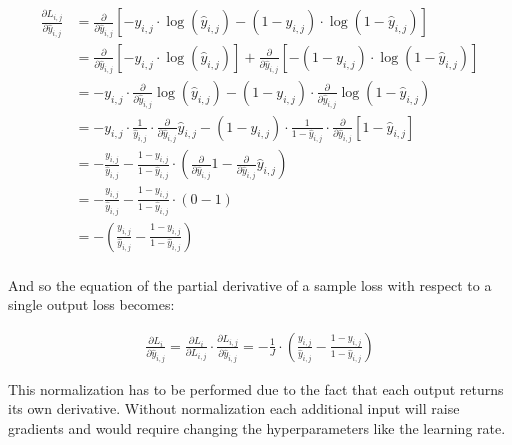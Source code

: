\documentclass[a4paper]{article}
\begin{document}
\begin{align*}
    \frac{\partial L_{i,j}}{\partial\hat{y}_{i,j}} &= \frac{\partial}{\partial\hat{y}_{i,j}} \left[ -y_{i,j} \cdot \log(\hat{y}_{i,j}) - (1-y_{i,j}) \cdot \log(1-\hat{y}_{i,j}) \right] \\
    &= \frac{\partial}{\partial\hat{y}_{i,j}} \left[ -y_{i,j} \cdot \log(\hat{y}_{i,j}) \right] + \frac{\partial}{\partial\hat{y}_{i,j}} \left[ -(1-y_{i,j}) \cdot \log(1-\hat{y}_{i,j}) \right]\\
    &= -y_{i,j} \cdot \frac{\partial}{\partial\hat{y}_{i,j}} \log(\hat{y}_{i,j}) - (1-y_{i,j}) \cdot \frac{\partial}{\partial\hat{y}_{i,j}} \log(1-\hat{y}_{i,j}) \\
    &= -y_{i,j} \cdot \frac{1}{\hat{y}_{i,j}} \cdot \frac{\partial}{\partial\hat{y}_{i,j}}\hat{y}_{i,j} - (1-y_{i,j}) \cdot \frac{1}{1-\hat{y}_{i,j}} \cdot \frac{\partial}{\partial\hat{y}_{i,j}}[1-\hat{y}_{i,j}] \\
    &= -\frac{y_{i,j}}{\hat{y}_{i,j}} - \frac{1-y_{i,j}}{1-\hat{y}_{i,j}} \cdot \left( \frac{\partial}{\partial\hat{y}_{i,j}}1 - \frac{\partial}{\partial\hat{y}_{i,j}} \hat{y}_{i,j} \right) \\
    &= -\frac{y_{i,j}}{\hat{y}_{i,j}} - \frac{1-y_{i,j}}{1-\hat{y}_{i,j}} \cdot (0-1) \\
    &= - \left( \frac{y_{i,j}}{\hat{y}_{i,j}} - \frac{1-y_{i,j}}{1-\hat{y}_{i,j}} \right) \\
\end{align*}

And so the equation of the partial derivative of a sample loss with respect to a single output loss becomes:

\begin{align*}
    \frac{\partial L_i}{\partial\hat{y}_{i,j}} = \frac{\partial L_i}{\partial L_{i,j}} \cdot \frac{\partial L_{i,j}}{\partial\hat{y}_{i,j}} = -\frac{1}{J} \cdot \left( \frac{y_{i,j}}{\hat{y}_{i,j}} - \frac{1-y_{i,j}}{1-\hat{y}_{i,j}} \right)
\end{align*}

This normalization has to be performed due to the fact that each output returns its own derivative. Without normalization each additional input will raise gradients and would require changing the hyperparameters like the learning rate.
\end{document}
